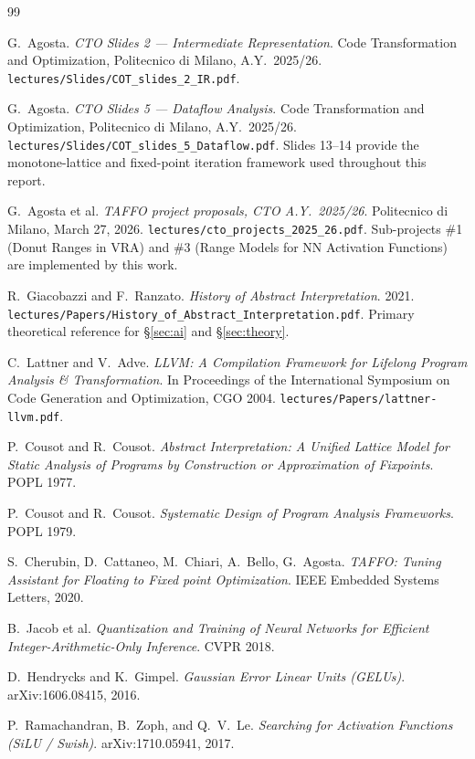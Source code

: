 \documentclass[11pt,a4paper]{article}
\theoremstyle{plain}
\begin{document}
\clearpage
\begin{thebibliography}{99}

G.~Agosta. \emph{CTO Slides 2 --- Intermediate Representation}. Code
Transformation and Optimization, Politecnico di Milano, A.Y.\ 2025/26.
\texttt{lectures/Slides/COT\_slides\_2\_IR.pdf}.

G.~Agosta. \emph{CTO Slides 5 --- Dataflow Analysis}. Code
Transformation and Optimization, Politecnico di Milano, A.Y.\ 2025/26.
\texttt{lectures/Slides/COT\_slides\_5\_Dataflow.pdf}.
Slides 13--14 provide the monotone-lattice and fixed-point iteration
framework used throughout this report.

G.~Agosta et al. \emph{TAFFO project proposals, CTO A.Y.\ 2025/26}.
Politecnico di Milano, March 27, 2026.
\texttt{lectures/cto\_projects\_2025\_26.pdf}. Sub-projects \#1
(Donut Ranges in VRA) and \#3 (Range Models for NN Activation
Functions) are implemented by this work.

R.~Giacobazzi and F.~Ranzato. \emph{History of Abstract
Interpretation}. 2021.
\texttt{lectures/Papers/History\_of\_Abstract\_Interpretation.pdf}.
Primary theoretical reference for \S\ref{sec:ai} and \S\ref{sec:theory}.

C.~Lattner and V.~Adve. \emph{LLVM: A Compilation Framework for
Lifelong Program Analysis \& Transformation}. In Proceedings of the
International Symposium on Code Generation and Optimization, CGO
2004. \texttt{lectures/Papers/lattner-llvm.pdf}.

P.~Cousot and R.~Cousot. \emph{Abstract Interpretation: A Unified
Lattice Model for Static Analysis of Programs by Construction or
Approximation of Fixpoints}. POPL 1977.

P.~Cousot and R.~Cousot. \emph{Systematic Design of Program Analysis
Frameworks}. POPL 1979.

S.~Cherubin, D.~Cattaneo, M.~Chiari, A.~Bello, G.~Agosta.
\emph{TAFFO: Tuning Assistant for Floating to Fixed point
Optimization}. IEEE Embedded Systems Letters, 2020.

B.~Jacob et al. \emph{Quantization and Training of Neural Networks
for Efficient Integer-Arithmetic-Only Inference}. CVPR 2018.

D.~Hendrycks and K.~Gimpel. \emph{Gaussian Error Linear Units
(GELUs)}. arXiv:1606.08415, 2016.

P.~Ramachandran, B.~Zoph, and Q.~V.~Le. \emph{Searching for
Activation Functions (SiLU / Swish)}. arXiv:1710.05941, 2017.

\end{thebibliography}
\end{document}
